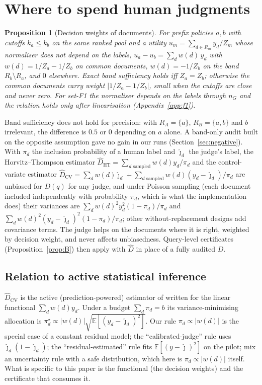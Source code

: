 \documentclass{article}
\newtheorem{proposition}{Proposition}
\begin{document}
\section{Where to spend human judgments}\label{sec:where}
\begin{proposition}[Decision weights of documents]\label{prop:C}
For prefix policies $a,b$ with cutoffs $k_a\le k_b$ on the same ranked pool and a utility $u_m=\sum_{d\in R_m}y_d/Z_m$ whose normaliser does not depend on the labels, $u_a-u_b=\sum_d w(d)\,y_d$ with $w(d)=1/Z_a-1/Z_b$ on common documents, $w(d)=-1/Z_b$ on the band $R_b\setminus R_a$, and $0$ elsewhere. Exact band sufficiency holds iff $Z_a=Z_b$; otherwise the common documents carry weight $|1/Z_a-1/Z_b|$, small when the cutoffs are close and never zero. For set-F1 the normaliser depends on the labels through $n_G$ and the relation holds only after linearisation (Appendix~\ref{app:f1}).
\end{proposition}
Band sufficiency does not hold for precision: with $R_A=\{a\}$, $R_B=\{a,b\}$ and $b$ irrelevant, the difference is $0.5$ or $0$ depending on $a$ alone. A band-only audit built on the opposite assumption gave no gain in our runs (Section~\ref{sec:negative}). With $\pi_d$ the inclusion probability of a human label and $\hat\jmath_d$ the judge's label, the Horvitz--Thompson estimator $\hat D_{\mathrm{HT}}=\sum_{d\text{ sampled}}w(d)y_d/\pi_d$ and the control-variate estimator $\hat D_{\mathrm{CV}}=\sum_d w(d)\hat\jmath_d+\sum_{d\text{ sampled}}w(d)(y_d-\hat\jmath_d)/\pi_d$ are unbiased for $D(q)$ for any judge, and under Poisson sampling (each document included independently with probability $\pi_d$, which is what the implementation does) their variances are $\sum_d w(d)^2y_d^2(1-\pi_d)/\pi_d$ and $\sum_d w(d)^2(y_d-\hat\jmath_d)^2(1-\pi_d)/\pi_d$; other without-replacement designs add covariance terms. The judge helps on the documents where it is right, weighted by decision weight, and never affects unbiasedness. Query-level certificates (Proposition~\ref{prop:B}) then apply with $\hat D$ in place of a fully audited $D$.

\subsection{Relation to active statistical inference}\label{sec:relation}
$\hat D_{\mathrm{CV}}$ is the active (prediction-powered) estimator of \citet{zrnic2024active} written for the linear functional $\sum_d w(d)y_d$. Under a budget $\sum_d\pi_d=b$ its variance-minimising allocation is $\pi_d^\star\propto|w(d)|\sqrt{\mathbb E[(y_d-\hat\jmath_d)^2]}$. Our rule $\pi_d\propto|w(d)|$ is the special case of a constant residual model; the ``calibrated-judge'' rule uses $\hat\jmath_d(1-\hat\jmath_d)$; the ``residual-estimated'' rule fits $\mathbb E[(y-\hat\jmath)^2]$ on the pilot; \citet{li2025robust} mix an uncertainty rule with a safe distribution, which here is $\pi_d\propto|w(d)|$ itself. What is specific to this paper is the functional (the decision weights) and the certificate that consumes it.
\end{document}
